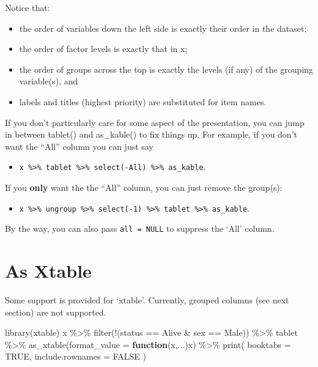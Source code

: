 \documentclass[
]{article}
\newenvironment{Shaded}{\begin{snugshade}}{\end{snugshade}}
\newcommand{\AttributeTok}[1]{\textcolor[rgb]{0.77,0.63,0.00}{#1}}
\newcommand{\ConstantTok}[1]{\textcolor[rgb]{0.00,0.00,0.00}{#1}}
\newcommand{\ControlFlowTok}[1]{\textcolor[rgb]{0.13,0.29,0.53}{\textbf{#1}}}
\newcommand{\FunctionTok}[1]{\textcolor[rgb]{0.00,0.00,0.00}{#1}}
\newcommand{\NormalTok}[1]{#1}
\newcommand{\SpecialCharTok}[1]{\textcolor[rgb]{0.00,0.00,0.00}{#1}}
\newcommand{\StringTok}[1]{\textcolor[rgb]{0.31,0.60,0.02}{#1}}
\providecommand{\tightlist}{%
  \setlength{\itemsep}{0pt}\setlength{\parskip}{0pt}}
\begin{document}
Notice that:

\begin{itemize}
\tightlist
\item
  the order of variables down the left side is exactly their order in
  the dataset;
\item
  the order of factor levels is exactly that in x;
\item
  the order of groups across the top is exactly the levels (if any) of
  the grouping variable(s), and
\item
  labels and titles (highest priority) are substituted for item names.
\end{itemize}

If you don't particularly care for some aspect of the presentation, you
can jump in between tablet() and as\_kable() to fix things up. For
example, if you don't want the ``All'' column you can just say

\begin{itemize}
\tightlist
\item
  \texttt{x\ \%\textgreater{}\%\ tablet\ \%\textgreater{}\%\ select(-All)\ \%\textgreater{}\%\ as\_kable}.
\end{itemize}

If you \textbf{only} want the the ``All'' column, you can just remove
the group(s):

\begin{itemize}
\tightlist
\item
  \texttt{x\ \%\textgreater{}\%\ ungroup\ \%\textgreater{}\%\ select(-1)\ \%\textgreater{}\%\ tablet\ \%\textgreater{}\%\ as\_kable}.
\end{itemize}

By the way, you can also pass \texttt{all\ =\ NULL} to suppress the
`All' column.

\hypertarget{as-xtable}{%
\section{As Xtable}\label{as-xtable}}

Some support is provided for `xtable'. Currently, grouped columns (see
next section) are not supported.

\begin{Shaded}
\begin{Highlighting}[]
\FunctionTok{library}\NormalTok{(xtable)}
\NormalTok{  x }\SpecialCharTok{\%\textgreater{}\%} 
    \FunctionTok{filter}\NormalTok{(}\SpecialCharTok{!}\NormalTok{(status }\SpecialCharTok{==} \StringTok{\textquotesingle{}Alive\textquotesingle{}} \SpecialCharTok{\&}\NormalTok{ sex }\SpecialCharTok{==} \StringTok{\textquotesingle{}Male\textquotesingle{}}\NormalTok{)) }\SpecialCharTok{\%\textgreater{}\%}
\NormalTok{    tablet }\SpecialCharTok{\%\textgreater{}\%} \FunctionTok{as\_xtable}\NormalTok{(}\AttributeTok{format\_value =} \ControlFlowTok{function}\NormalTok{(x,...)x) }\SpecialCharTok{\%\textgreater{}\%} 
    \FunctionTok{print}\NormalTok{(}
      \AttributeTok{booktabs =} \ConstantTok{TRUE}\NormalTok{, }
      \AttributeTok{include.rownames =} \ConstantTok{FALSE} 
\NormalTok{    )}
\end{Highlighting}
\end{Shaded}
\end{document}
